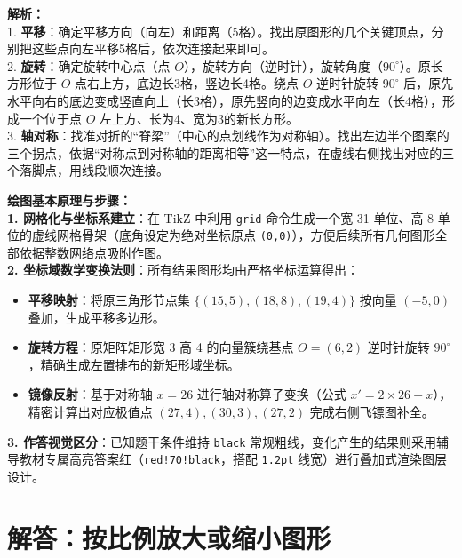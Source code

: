 \vspace{0.8cm}

{\small\color{gray}
\textbf{解析：}\\
1. \textbf{平移}：确定平移方向（向左）和距离（5格）。找出原图形的几个关键顶点，分别把这些点向左平移5格后，依次连接起来即可。\\
2. \textbf{旋转}：确定旋转中心点（点 $O$），旋转方向（逆时针），旋转角度（$90^{\circ}$）。原长方形位于 $O$ 点右上方，底边长3格，竖边长4格。绕点 $O$ 逆时针旋转 $90^{\circ}$ 后，原先水平向右的底边变成竖直向上（长3格），原先竖向的边变成水平向左（长4格），形成一个位于点 $O$ 左上方、长为4、宽为3的新长方形。\\
3. \textbf{轴对称}：找准对折的“脊梁”（中心的点划线作为对称轴）。找出左边半个图案的三个拐点，依据“对称点到对称轴的距离相等”这一特点，在虚线右侧找出对应的三个落脚点，用线段顺次连接。
}

\vspace{0.6cm}

{\small\color{blue!70!black}
\textbf{绘图基本原理与步骤：}\\
\textbf{1. 网格化与坐标系建立}：在 TikZ 中利用 \texttt{grid} 命令生成一个宽 31 单位、高 8 单位的虚线网格骨架（底角设定为绝对坐标原点 \texttt{(0,0)}），方便后续所有几何图形全部依据整数网络点吸附作图。\\
\textbf{2. 坐标域数学变换法则}：所有结果图形均由严格坐标运算得出：
   \begin{itemize}
       \item \textbf{平移映射}：将原三角形节点集 $\{(15,5), (18,8), (19,4)\}$ 按向量 $(-5, 0)$ 叠加，生成平移多边形。
       \item \textbf{旋转方程}：原矩阵矩形宽 3 高 4 的向量簇绕基点 $O=(6,2)$ 逆时针旋转 $90^{\circ}$，精确生成左置排布的新矩形域坐标。
       \item \textbf{镜像反射}：基于对称轴 $x=26$ 进行轴对称算子变换（公式 $x' = 2 \times 26 - x$），精密计算出对应极值点 $(27,4), (30,3), (27,2)$ 完成右侧飞镖图补全。
   \end{itemize}
\textbf{3. 作答视觉区分}：已知题干条件维持 \texttt{black} 常规粗线，变化产生的结果则采用辅导教材专属高亮答案红（\texttt{red!70!black}，搭配 \texttt{1.2pt} 线宽）进行叠加式渲染图层设计。
}


\newpage



\section{解答：按比例放大或缩小图形}

